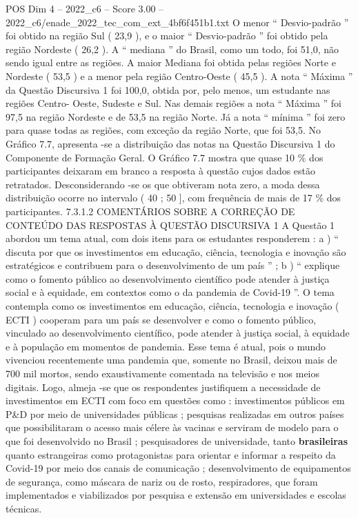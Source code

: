 \begin{textsample}{POS Dim 4 – 2022\_c6 – Score 3.00 – 2022\_c6/enade\_2022\_tec\_com\_ext\_4bf6f451b1.txt}
O menor “ Desvio-padrão ” foi obtido na região Sul ( 23,9 ), e o maior “ Desvio-padrão ” foi obtido pela região Nordeste ( 26,2 ).
A “ mediana ” do Brasil, como um todo, foi 51,0, não sendo igual entre as regiões.
A maior Mediana foi obtida pelas regiões Norte e Nordeste ( 53,5 ) e a menor pela região Centro-Oeste ( 45,5 ).
A nota “ Máxima ” da Questão Discursiva 1 foi 100,0, obtida por, pelo menos, um estudante nas regiões Centro- Oeste, Sudeste e Sul.
Nas demais regiões a nota “ Máxima ” foi 97,5 na região Nordeste e de 53,5 na região Norte.
Já a nota “ mínima ” foi zero para quase todas as regiões, com exceção da região Norte, que foi 53,5.
No Gráfico 7.7, apresenta -se a distribuição das notas na Questão Discursiva 1 do Componente de Formação Geral.
O Gráfico 7.7 mostra que quase 10 \% dos participantes deixaram em branco a resposta à questão cujos dados estão retratados.
Desconsiderando -se os que obtiveram nota zero, a moda dessa distribuição ocorre no intervalo ( 40 ; 50 ], com frequência de mais de 17 \% dos participantes. 7.3.1.2 COMENTÁRIOS SOBRE A CORREÇÃO DE CONTEÚDO DAS RESPOSTAS À QUESTÃO DISCURSIVA 1 A Questão 1 abordou um tema atual, com dois itens para os estudantes responderem : a ) “ discuta por que os investimentos em educação, ciência, tecnologia e inovação são estratégicos e contribuem para o desenvolvimento de um país ” ; b ) “ explique como o fomento público ao desenvolvimento científico pode atender à justiça social e à equidade, em contextos como o da pandemia de Covid-19 ”.
O tema contempla como os investimentos em educação, ciência, tecnologia e inovação ( ECTI ) cooperam para um país se desenvolver e como o fomento público, vinculado ao desenvolvimento científico, pode atender à justiça social, à equidade e à população em momentos de pandemia.
Esse tema é atual, pois o mundo vivenciou recentemente uma pandemia que, somente no Brasil, deixou mais de 700 mil mortos, sendo exaustivamente comentada na televisão e nos meios digitais.
Logo, almeja -se que os respondentes justifiquem a necessidade de investimentos em ECTI com foco em questões como : investimentos públicos em P\&D por meio de universidades públicas ; pesquisas realizadas em outros países que possibilitaram o acesso mais célere às vacinas e serviram de modelo para o que foi desenvolvido no Brasil ; pesquisadores de universidade, tanto \textbf{brasileiras} quanto estrangeiras como protagonistas para orientar e informar a respeito da Covid-19 por meio dos canais de comunicação ; desenvolvimento de equipamentos de segurança, como máscara de nariz ou de rosto, respiradores, que foram implementados e viabilizados por pesquisa e extensão em universidades e escolas técnicas.

\end{textsample}
